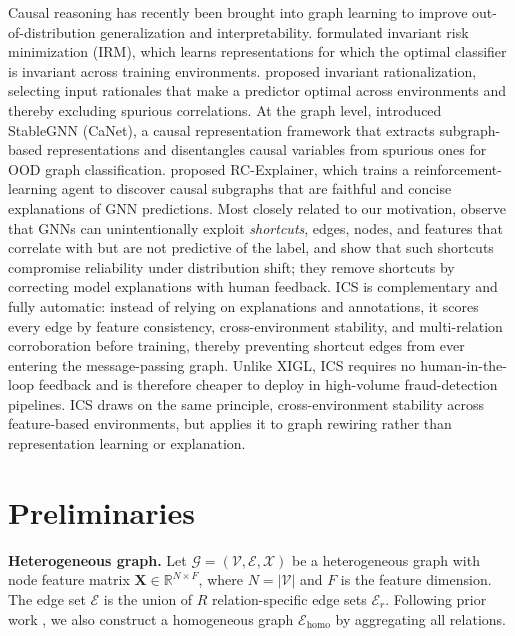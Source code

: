 \documentclass[11pt]{article}
\begin{document}
Causal reasoning has recently been brought into graph learning to improve out-of-distribution generalization and interpretability. \cite{arjovsky2019irm} formulated invariant risk minimization (IRM), which learns representations for which the optimal classifier is invariant across training environments. \cite{chang2020causal} proposed invariant rationalization, selecting input rationales that make a predictor optimal across environments and thereby excluding spurious correlations. At the graph level, \cite{fan2022canet} introduced StableGNN (CaNet), a causal representation framework that extracts subgraph-based representations and disentangles causal variables from spurious ones for OOD graph classification. \cite{wang2021rcexplainer} proposed RC-Explainer, which trains a reinforcement-learning agent to discover causal subgraphs that are faithful and concise explanations of GNN predictions. Most closely related to our motivation, \cite{younesian2026xigl} observe that GNNs can unintentionally exploit \emph{shortcuts}, edges, nodes, and features that correlate with but are not predictive of the label, and show that such shortcuts compromise reliability under distribution shift; they remove shortcuts by correcting model explanations with human feedback. ICS is complementary and fully automatic: instead of relying on explanations and annotations, it scores every edge by feature consistency, cross-environment stability, and multi-relation corroboration before training, thereby preventing shortcut edges from ever entering the message-passing graph. Unlike XIGL, ICS requires no human-in-the-loop feedback and is therefore cheaper to deploy in high-volume fraud-detection pipelines. ICS draws on the same principle, cross-environment stability across feature-based environments, but applies it to graph rewiring rather than representation learning or explanation.

\section{Preliminaries}\label{sec:prelim}

\textbf{Heterogeneous graph.} Let $\mathcal{G}=(\mathcal{V}, \mathcal{E}, \mathcal{X})$ be a heterogeneous graph with node feature matrix $\mathbf{X}\in\mathbb{R}^{N\times F}$, where $N=|\mathcal{V}|$ and $F$ is the feature dimension. The edge set $\mathcal{E}$ is the union of $R$ relation-specific edge sets $\mathcal{E}_r$. Following prior work \cite{dou2020caregnn}, we also construct a homogeneous graph $\mathcal{E}_{\text{homo}}$ by aggregating all relations.
\end{document}
